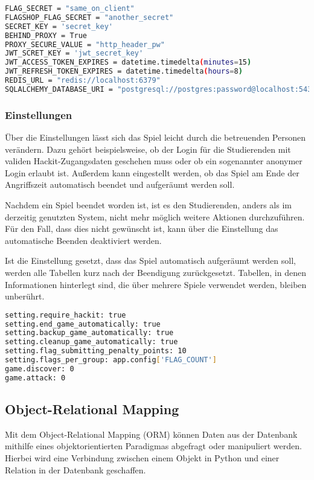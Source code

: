 \begin{lstlisting}[language=bash, frame=single, caption={GIS Auszug aus der Konfiguration}, captionpos=b, label={lst:gis-config}]
FLAG_SECRET = "same_on_client"
FLAGSHOP_FLAG_SECRET = "another_secret"
SECRET_KEY = 'secret_key'
BEHIND_PROXY = True
PROXY_SECURE_VALUE = "http_header_pw"
JWT_SCRET_KEY = 'jwt_secret_key'
JWT_ACCESS_TOKEN_EXPIRES = datetime.timedelta(minutes=15)
JWT_REFRESH_TOKEN_EXPIRES = datetime.timedelta(hours=8)
REDIS_URL = "redis://localhost:6379"
SQLALCHEMY_DATABASE_URI = "postgresql://postgres:password@localhost:5432/postgres"
\end{lstlisting}

\subsubsection{Einstellungen} \label{subsub:realisierung-settings}
Über die Einstellungen lässt sich das Spiel leicht durch die betreuenden Personen verändern.
Dazu gehört beispielsweise, ob der Login für die Studierenden mit validen Hackit-Zugangsdaten geschehen muss oder ob ein sogenannter anonymer Login erlaubt ist. Außerdem kann eingestellt werden, ob das Spiel am Ende der Angriffszeit automatisch beendet und aufgeräumt werden soll. 

Nachdem ein Spiel beendet worden ist, ist es den Studierenden, anders als im derzeitig genutzten System, nicht mehr möglich weitere Aktionen durchzuführen. Für den Fall, dass dies nicht gewünscht ist, kann über die Einstellung das automatische Beenden deaktiviert werden.

Ist die Einstellung gesetzt, dass das Spiel automatisch aufgeräumt werden soll, werden alle Tabellen kurz nach der Beendigung zurückgesetzt. Tabellen, in denen Informationen hinterlegt sind, die über mehrere Spiele verwendet werden, bleiben unberührt.

\begin{lstlisting}[language=bash, frame=single, caption={GIS Auszug aus den Einstellungen}, captionpos=b, label={lst:gis-settings}]
setting.require_hackit: true
setting.end_game_automatically: true
setting.backup_game_automatically: true
setting.cleanup_game_automatically: true
setting.flag_submitting_penalty_points: 10
setting.flags_per_group: app.config['FLAG_COUNT']
game.discover: 0
game.attack: 0
\end{lstlisting}

\subsection{Object-Relational Mapping}
Mit dem Object-Relational Mapping (ORM) können Daten aus der Datenbank mithilfe eines objektorientierten Paradigmas abgefragt oder manipuliert werden. Hierbei wird eine Verbindung zwischen einem Objekt in Python und einer Relation in der Datenbank geschaffen.

